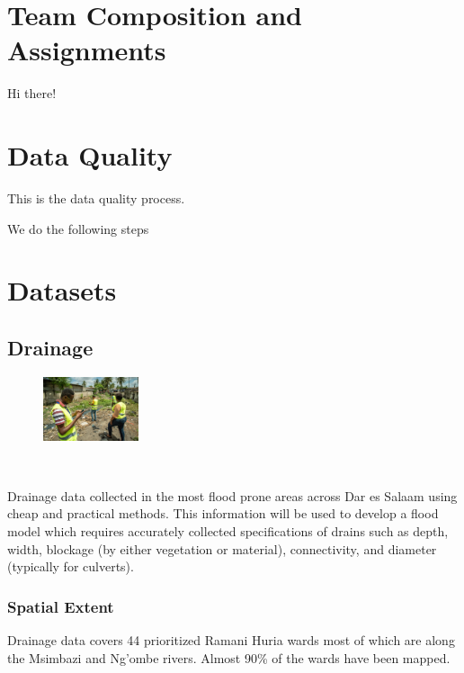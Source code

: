\documentclass[a4paper,12pt,twoside]{article}
\begin{document}
\section{Team Composition and Assignments}
Hi there!

\section{Data Quality}
This is the data quality process. 

We do the following steps


\section{Datasets}

\subsection{Drainage}
\begin{figure} %
    \centering
    \includegraphics[width=0.25\textwidth]{images/Drainage_Mapping.jpg}
\end{figure}

\

Drainage data collected in the most flood prone areas across Dar es Salaam using cheap  and practical methods. This information will be used to develop a flood model which requires accurately collected specifications of drains such as depth, width, blockage (by either vegetation or material), connectivity, and diameter (typically for culverts).

\subsubsection{Spatial Extent}
Drainage data covers 44 prioritized Ramani Huria wards most of which are along the Msimbazi and Ng’ombe rivers. Almost 90\% of the wards have been mapped.
\end{document}
